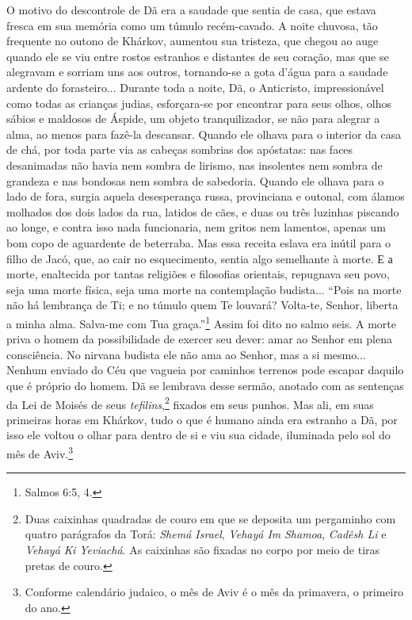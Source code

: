 O motivo do descontrole de Dã era a saudade que sentia de casa, que
estava fresca em sua memória como um túmulo recém-cavado. A noite
chuvosa, tão frequente no outono de Khárkov, aumentou sua tristeza, que
chegou ao auge quando ele se viu entre rostos estranhos e distantes de
seu coração, mas que se alegravam e sorriam uns aos outros, tornando-se
a gota d'água para a saudade ardente do forasteiro... Durante toda a
noite, Dã, o Anticristo, impressionável como todas as crianças judias,
esforçara-se por encontrar para seus olhos, olhos sábios e maldosos de
Áspide, um objeto tranquilizador, se não para alegrar a alma, ao menos
para fazê-la descansar. Quando ele olhava para o interior da casa de
chá, por toda parte via as cabeças sombrias dos apóstatas: nas faces
desanimadas não havia nem sombra de lirismo, nas insolentes nem sombra
de grandeza e nas bondosas nem sombra de sabedoria. Quando ele olhava
para o lado de fora, surgia aquela desesperança russa, provinciana e
outonal, com álamos molhados dos dois lados da rua, latidos de cães, e
duas ou três luzinhas piscando ao longe, e contra isso nada funcionaria,
nem gritos nem lamentos, apenas um bom copo de aguardente de beterraba.
Mas essa receita eslava era inútil para o filho de Jacó, que, ao cair no
esquecimento, sentia algo semelhante à morte. Е а morte, enaltecida por
tantas religiões e filosofias orientais, repugnava seu povo, seja uma
morte física, seja uma morte na contemplação budista... ``Pois na morte
não há lembrança de Ti; e no túmulo quem Te louvará? Volta-te, Senhor,
liberta a minha alma. Salva-me com Tua graça.''\footnote{Salmos 6:5, 4.}
Assim foi dito no salmo seis. A morte priva o homem da possibilidade de
exercer seu dever: amar ao Senhor em plena consciência. No nirvana
budista ele não ama ao Senhor, mas a si mesmo... Nenhum enviado do Céu
que vagueia por caminhos terrenos pode escapar daquilo que é próprio do
homem. Dã se lembrava desse sermão, anotado com as sentenças da Lei de
Moisés de seus \emph{tefilins},\footnote{Duas caixinhas quadradas de
  couro em que se deposita um pergaminho com quatro parágrafos da Torá:
  \emph{Shemá Israel}, \emph{Vehayá Im} \emph{Shamoa}, \emph{Cadêsh Li}
  e \emph{Vehayá Ki Yeviachá}. As caixinhas são fixadas no corpo por
  meio de tiras pretas de couro.} fixados em seus punhos. Mas ali, em
suas primeiras horas em Khárkov, tudo o que é humano ainda era estranho
a Dã, por isso ele voltou o olhar para dentro de si e viu sua cidade,
iluminada pelo sol do mês de Aviv.\footnote{Conforme calendário judaico,
  o mês de Aviv é o mês da primavera, o primeiro do ano.}

